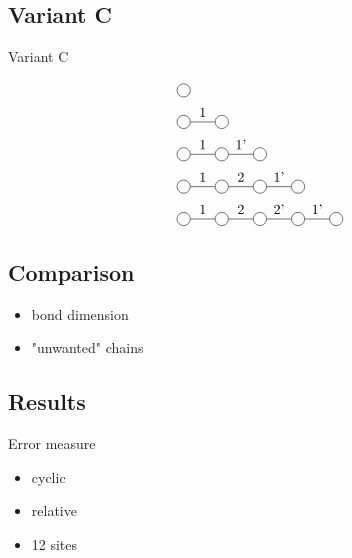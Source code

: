 \documentclass[aspectratio=169]{beamer}
\begin{document}
\subsection{Variant C}
\begin{frame}{Variant C}

    \begin{equation}
        \begin{split}
            &\mpob{1}{ {,}  }{}{}{}{{,,}} \\
            &\mpob{2}{ {,"1",}  }{}{}{}{{,,}}\\
            &\mpob{3}{ {,"1","1'",}  }{}{}{}{{,,,}}\\
            &\mpob{4}{ {,"1","2","1'",}  }{}{}{}{{,,,,,}}\\
            &\mpob{5}{ {,"1","2","2'","1'",}  }{}{}{}{{,,,,,}}\\
        \end{split}
    \end{equation}

\end{frame}

\subsection{Comparison}
\begin{frame}
    \begin{itemize}
        \item bond dimension
        \item "unwanted" chains
    \end{itemize}
\end{frame}

\subsection{Results}
\begin{frame}{Error measure}

    \begin{itemize}
        \item cyclic
        \item relative
        \item 12 sites
    \end{itemize}
\end{frame}
\end{document}
